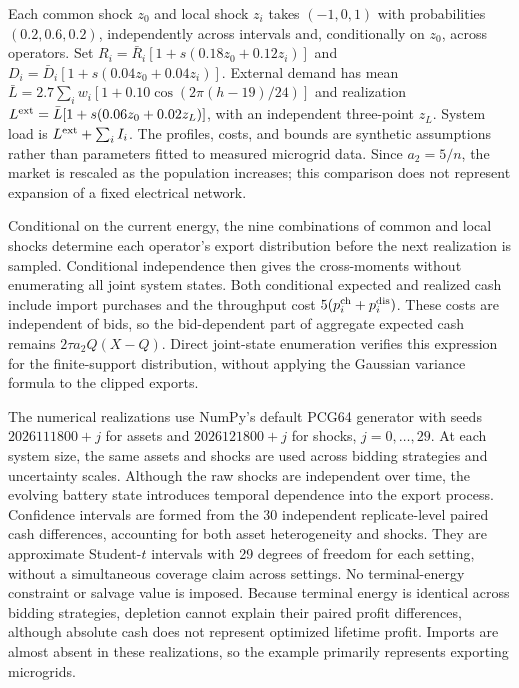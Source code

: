 \documentclass[journal]{IEEEtran}
\begin{document}
Each common shock $z_0$ and local shock $z_i$ takes $(-1,0,1)$ with probabilities $(0.2,0.6,0.2)$, independently across intervals and, conditionally on $z_0$, across operators. Set $R_i=\bar R_i[1+s(0.18z_0+0.12z_i)]$ and $D_i=\bar D_i[1+s(0.04z_0+0.04z_i)]$. External demand has mean $\bar L=2.7\sum_iw_i[1+0.10\cos(2\pi(h-19)/24)]$ and realization $L^{\rm ext}=\bar L[1+s(0.06z_0+0.02z_L)]$, with an independent three-point $z_L$. System load is $L^{\rm ext}+\sum_iI_i$. The profiles, costs, and bounds are synthetic assumptions rather than parameters fitted to measured microgrid data. Since $a_2=5/n$, the market is rescaled as the population increases; this comparison does not represent expansion of a fixed electrical network.

Conditional on the current energy, the nine combinations of common and local shocks determine each operator's export distribution before the next realization is sampled. Conditional independence then gives the cross-moments without enumerating all joint system states. Both conditional expected and realized cash include import purchases and the throughput cost $5(p_i^{\rm ch}+p_i^{\rm dis})$. These costs are independent of bids, so the bid-dependent part of aggregate expected cash remains $2\tau a_2Q(X-Q)$. Direct joint-state enumeration verifies this expression for the finite-support distribution, without applying the Gaussian variance formula to the clipped exports.

The numerical realizations use NumPy's default PCG64 generator with seeds $2026111800+j$ for assets and $2026121800+j$ for shocks, $j=0,\ldots,29$. At each system size, the same assets and shocks are used across bidding strategies and uncertainty scales. Although the raw shocks are independent over time, the evolving battery state introduces temporal dependence into the export process. Confidence intervals are formed from the 30 independent replicate-level paired cash differences, accounting for both asset heterogeneity and shocks. They are approximate Student-$t$ intervals with 29 degrees of freedom for each setting, without a simultaneous coverage claim across settings. No terminal-energy constraint or salvage value is imposed. Because terminal energy is identical across bidding strategies, depletion cannot explain their paired profit differences, although absolute cash does not represent optimized lifetime profit. Imports are almost absent in these realizations, so the example primarily represents exporting microgrids.


\end{document}
